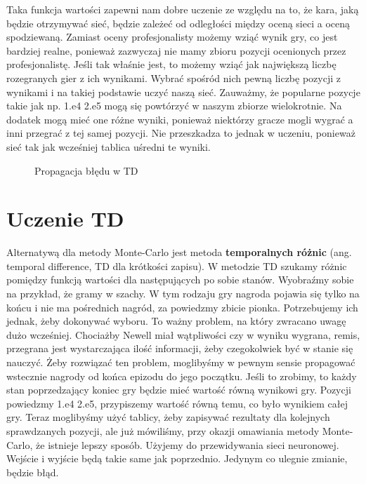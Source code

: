 Taka funkcja wartości zapewni nam dobre uczenie ze względu na to, że kara, jaką będzie otrzymywać sieć, będzie zależeć od odległości między oceną sieci a oceną spodziewaną. Zamiast oceny profesjonalisty możemy wziąć wynik gry, co jest bardziej realne, ponieważ zazwyczaj nie mamy zbioru pozycji ocenionych przez profesjonalistę. Jeśli tak właśnie jest, to możemy wziąć jak największą liczbę rozegranych gier z ich wynikami. Wybrać spośród nich pewną liczbę pozycji z wynikami i na takiej podstawie uczyć naszą sieć. Zauważmy, że popularne pozycje takie jak np. 1.e4 2.e5 mogą się powtórzyć w naszym zbiorze wielokrotnie. Na dodatek mogą mieć one różne wyniki, ponieważ niektórzy gracze mogli wygrać a inni przegrać z tej samej pozycji. Nie przeszkadza to jednak w uczeniu, ponieważ sieć tak jak wcześniej tablica uśredni te wyniki.

\clearpage
\begin{figure}[H]
\centering

\caption{Propagacja błędu w TD}
\end{figure}
\clearpage

\section{Uczenie TD}

Alternatywą dla metody Monte-Carlo jest metoda \textbf{temporalnych różnic} (ang. temporal difference, TD dla krótkości zapisu). W metodzie TD szukamy różnic pomiędzy funkcją wartości dla następujących po sobie stanów. Wyobraźmy sobie na przykład, że gramy w szachy. W tym rodzaju gry nagroda pojawia się tylko na końcu i nie ma pośrednich nagród, za powiedzmy zbicie pionka. Potrzebujemy ich jednak, żeby dokonywać wyboru. To ważny problem, na który zwracano uwagę dużo wcześniej. Chociażby Newell miał wątpliwości czy w wyniku wygrana, remis, przegrana jest wystarczająca ilość informacji, żeby czegokolwiek być w stanie się nauczyć. Żeby rozwiązać ten problem, moglibyśmy w pewnym sensie propagować wstecznie nagrody od końca epizodu do jego początku. Jeśli to zrobimy, to każdy stan poprzedzający koniec gry będzie mieć wartość równą wynikowi gry. Pozycji powiedzmy 1.e4 2.e5, przypiszemy wartość równą temu, co było wynikiem całej gry. Teraz moglibyśmy użyć tablicy, żeby zapisywać rezultaty dla kolejnych sprawdzanych pozycji, ale już mówiliśmy, przy okazji omawiania metody Monte-Carlo, że istnieje lepszy sposób. Użyjemy do przewidywania sieci neuronowej. Wejście i wyjście będą takie same jak poprzednio. Jedynym co ulegnie zmianie, będzie błąd.

